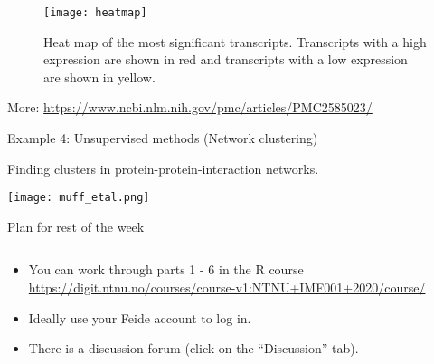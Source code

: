 \documentclass[10pt,ignorenonframetext,]{beamer}
\providecommand{\tightlist}{%
  \setlength{\itemsep}{0pt}\setlength{\parskip}{0pt}}
\begin{document}
\begin{frame}

\begin{figure}
\texttt{[image: heatmap]} \caption{Heat map of the most significant transcripts. Transcripts with a high expression are shown in red and transcripts with a low expression are shown in yellow.}\label{fig:heatmap_pic}
\end{figure}

\tiny

More: \url{https://www.ncbi.nlm.nih.gov/pmc/articles/PMC2585023/}

\end{frame}

\begin{frame}{Example 4: Unsupervised methods (Network clustering)}
\protect\hypertarget{example-4-unsupervised-methods-network-clustering}{}

\vspace{2mm}

Finding clusters in protein-protein-interaction networks. \vspace{2mm}

\texttt{[image: muff\_etal.png]}

\end{frame}

\begin{frame}{Plan for rest of the week}
\protect\hypertarget{plan-for-rest-of-the-week}{}

\(~\)

\begin{itemize}
\tightlist
\item
  You can work through parts 1 - 6 in the R course
  \url{https://digit.ntnu.no/courses/course-v1:NTNU+IMF001+2020/course/}
\end{itemize}

\vspace{2mm}

\begin{itemize}
\tightlist
\item
  Ideally use your Feide account to log in.
\end{itemize}

\vspace{2mm}

\begin{itemize}
\tightlist
\item
  There is a discussion forum (click on the ``Discussion'' tab).
\end{itemize}

\end{frame}
\end{document}
